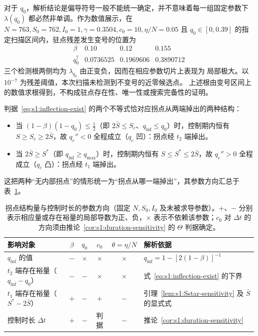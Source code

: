 \documentclass[lang=cn,a4paper,newtx]{elegantpaper}
\numberwithin{equation}{section}
\theoremstyle{plain}
\newcommand{\qinf}{q_{\mathrm{inf}}}
\begin{document}
对于 $q_0$，解析结论是偏导符号一般不能统一确定，并不意味着每一组固定参数下
$\lambda(q_0)$ 都必然非单调。作为数值展示，在
$N=763,S_0=762,I_0=1,\gamma=0.3504,c_0=10,\eta/N=0.05$
且 $q_0\in[0,0.39]$ 的指定扫描区间内，驻点残差发生变号的位置为
\[
\begin{array}{c|ccc}
\beta & 0.10 & 0.12 & 0.155\\
\hline
q_0^\dagger
&0.0736525&0.1969606&0.3890712
\end{array}
\]
三个检测根两侧均为 $\lambda_{q_0}$ 由正变负，因而在相应参数切片上表现为
局部极大。以 $10^{-7}$ 为残差阈值，本次扫描未检测到不变号的近零候选点。
上述根由变号区间上的数值求根得到，不构成驻点存在性、唯一性或搜索完备性的证明。

判据~\eqref{eq:s1:inflection-exist} 的两个不等式恰对应拐点从两端掉出的两种结构：
\begin{itemize}
\item 当 $(1-\beta)(1-q_0)\le\tfrac12$（即 $2\bar S\le S_c$、$\qinf\le q_0$）时，控制期内恒有 $S\ge S_c\ge 2\bar S$，故 $q_c''<0$ 全程成立（$q_c$ 凹）：拐点经 $t_2$ 端掉出。
\item 当 $2\bar S\ge S^*$（即 $\qinf\ge q_{\max}$）时，控制期内恒有 $S\le S^*\le 2\bar S$，故 $q_c''>0$ 全程成立（$q_c$ 凸）：拐点经 $t_1$ 端掉出。
\end{itemize}
这把两种``无内部拐点''的情形统一为``拐点从哪一端掉出''，其参数方向汇总于表~\ref{tab:s1:inflection-roles}。

\begin{table}[htbp]
  \centering
  \footnotesize
  \caption{拐点结构量与控制时长的参数方向（固定 $N,S_0,I_0$ 及未被求导参数）。$+$、$-$ 分别表示相应量或存在裕量的局部导数为正、负，$\times$ 表示不依赖该参数；$c_0$ 对 $\Delta t$ 的方向须由推论~\ref{cor:s1:duration-sensitivity} 的 $\Theta$ 判据确定。}
  \label{tab:s1:inflection-roles}
  \begin{tabularx}{\textwidth}{lccccX}
    \toprule
    影响对象 & $\beta$ & $q_0$ & $c_0$ & $\theta=\eta/N$ & 解析依据\\
    \midrule
    $\qinf$ 的值
      & $-$ & $\times$ & $\times$ & $\times$
      & $\qinf=1-[2(1-\beta)]^{-1}$\\
    $t_2$ 端存在裕量（$\qinf-q_0$）
      & $-$ & $-$ & $\times$ & $\times$
      & 式~\eqref{eq:s1:inflection-exist} 的下界\\
    $t_1$ 端存在裕量（$S^*-2\bar S$）
      & $+$ & $-$ & $+$ & $-$
      & 引理~\ref{lem:s1:Sstar-sensitivity} 及 $\bar S$ 的显式式\\
    控制时长 $\Delta t$
      & $+$ & $-$ & 判据 & $-$
      & 推论~\ref{cor:s1:duration-sensitivity}\\
    \bottomrule
  \end{tabularx}
\end{table}
\end{document}
